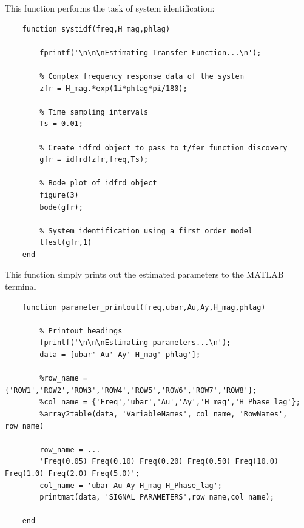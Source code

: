 \documentclass{article}
\begin{document}
\vspace{1cm}
This function performs the task of system identification:
\begin{lstlisting}
	function systidf(freq,H_mag,phlag)
	
		fprintf('\n\n\nEstimating Transfer Function...\n');
	
		% Complex frequency response data of the system
		zfr = H_mag.*exp(1i*phlag*pi/180);
	
		% Time sampling intervals 
		Ts = 0.01;
	
		% Create idfrd object to pass to t/fer function discovery
		gfr = idfrd(zfr,freq,Ts);
	
		% Bode plot of idfrd object
		figure(3)
		bode(gfr);
	
		% System identification using a first order model
		tfest(gfr,1)
	end
\end{lstlisting}

\newpage
This function simply prints out the estimated parameters to the MATLAB terminal
\begin{lstlisting}
	function parameter_printout(freq,ubar,Au,Ay,H_mag,phlag)
	
		% Printout headings
		fprintf('\n\n\nEstimating parameters...\n');
		data = [ubar' Au' Ay' H_mag' phlag'];
	
		%row_name = {'ROW1','ROW2','ROW3','ROW4','ROW5','ROW6','ROW7','ROW8'};
		%col_name = {'Freq','ubar','Au','Ay','H_mag','H_Phase_lag'};
		%array2table(data, 'VariableNames', col_name, 'RowNames', row_name)
	
		row_name = ...
		'Freq(0.05) Freq(0.10) Freq(0.20) Freq(0.50) Freq(10.0) Freq(1.0) Freq(2.0) Freq(5.0)';
		col_name = 'ubar Au Ay H_mag H_Phase_lag';
		printmat(data, 'SIGNAL PARAMETERS',row_name,col_name);
		
	end
\end{lstlisting}
\end{document}
